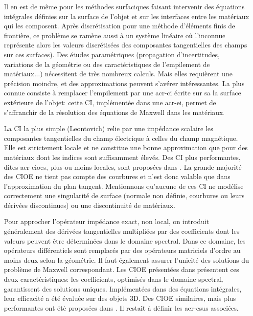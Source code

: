 Il en est de même pour les méthodes surfaciques faisant intervenir des équations intégrales définies sur la surface de l'objet et sur les interfaces entre les matériaux qui les composent. 
Après discrétisation pour une méthode d’éléments finis de frontière, ce problème se ramène aussi à un système linéaire où l'inconnue représente alors les valeurs discrétisées des composantes tangentielles des champs sur ces surfaces).
Des études paramétriques (propagation d’incertitudes, variations de la géométrie ou des caractéristiques de l'empilement de matériaux...) nécessitent de très nombreux calculs.
Mais elles requièrent une précision moindre, et des approximations peuvent s'avérer intéressantes.
La plus connue consiste à remplacer l'empilement par une \gls{acr-ci} écrite sur sa la surface extérieure de l'objet: cette CI, implémentée dans une \gls{acr-ei}, permet de s’affranchir de la résolution des équations de Maxwell dans les matériaux.

La CI la plus simple (Leontovich) relie par une impédance scalaire les composantes tangentielles du champ électrique à celles du champ magnétique.
Elle est strictement locale et ne constitue une bonne approximation que pour des matériaux dont les indices sont suffisamment élevés.
Des CI plus performantes, dites \glspl{acr-cioe}, plus ou moins locales, sont proposées dans \cite{hoppe_impedance_1995,stupfel_implementation_2015}.
La grande majorité des CIOE ne tient pas compte des courbures et n’est donc valable que dans l'approximation du plan tangent.
Mentionnons qu'aucune de ces CI ne modélise correctement une singularité de surface (normale non définie, courbures ou leurs dérivées discontinues) ou une discontinuité de matériaux.

Pour approcher l’opérateur impédance exact, non local, on introduit généralement des dérivées tangentielles multipliées par des coefficients dont les valeurs peuvent être déterminées dans le domaine spectral. Dans ce domaine, les opérateurs différentiels sont remplacés par des opérateurs matriciels d'ordre au moins deux selon la géométrie.
Il faut également assurer l’unicité des solutions du problème de Maxwell correspondant.
Les CIOE présentées dans \cite{stupfel_sufficient_2011,stupfel_implementation_2015} présentent ces deux caractéristiques: les coefficients, optimisés dans le domaine spectral, garantissent des solutions uniques.
Implémentées dans des équations intégrales, leur efficacité a été évaluée sur des objets 3D.
Des CIOE similaires, mais plus performantes ont été proposées dans \cite{marceaux_high-order_2000,aubakirov_electromagnetic_2014,soudais_3d_2017}.
Il restait à définir les \glspl{acr-csu} associées.

